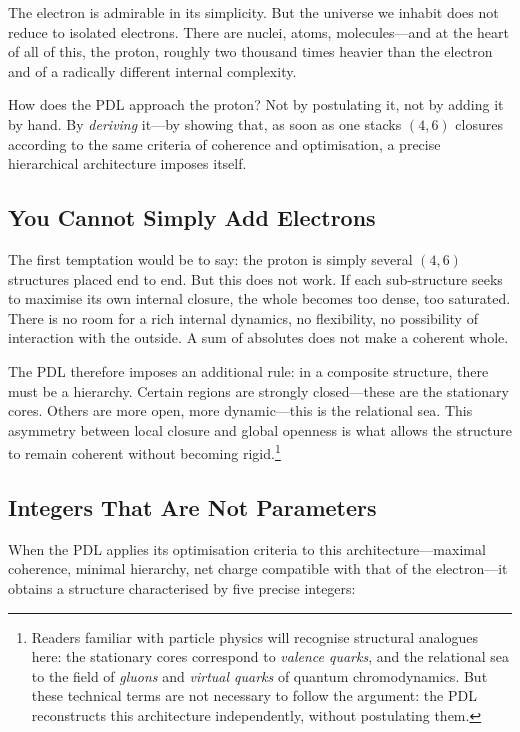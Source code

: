 \documentclass[12pt, a4paper, openright]{book}
\begin{document}
The electron is admirable in its simplicity. But the universe we inhabit does not reduce to isolated electrons. There are nuclei, atoms, molecules---and at the heart of all of this, the proton, roughly two thousand times heavier than the electron and of a radically different internal complexity.

\medskip

How does the PDL approach the proton? Not by postulating it, not by adding it by hand. By \emph{deriving} it---by showing that, as soon as one stacks $(4,6)$ closures according to the same criteria of coherence and optimisation, a precise hierarchical architecture imposes itself.

\subsection*{You Cannot Simply Add Electrons}

The first temptation would be to say: the proton is simply several $(4,6)$ structures placed end to end. But this does not work. If each sub-structure seeks to maximise its own internal closure, the whole becomes too dense, too saturated. There is no room for a rich internal dynamics, no flexibility, no possibility of interaction with the outside. A sum of absolutes does not make a coherent whole.

\medskip

The PDL therefore imposes an additional rule: in a composite structure, there must be a hierarchy. Certain regions are strongly closed---these are the stationary cores. Others are more open, more dynamic---this is the relational sea. This asymmetry between local closure and global openness is what allows the structure to remain coherent without becoming rigid.\footnote{Readers familiar with particle physics will recognise structural analogues here: the stationary cores correspond to \emph{valence quarks}, and the relational sea to the field of \emph{gluons} and \emph{virtual quarks} of quantum chromodynamics. But these technical terms are not necessary to follow the argument: the PDL reconstructs this architecture independently, without postulating them.}

\subsection*{Integers That Are Not Parameters}

When the PDL applies its optimisation criteria to this architecture---maximal coherence, minimal hierarchy, net charge compatible with that of the electron---it obtains a structure characterised by five precise integers:
\end{document}
